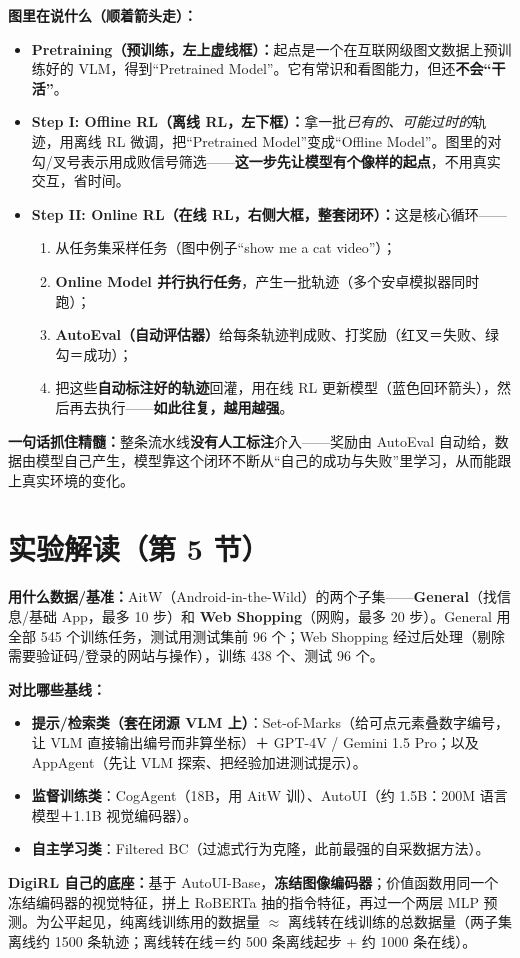\documentclass[11pt,UTF8,fontset=fandol]{ctexart}
\begin{document}
\textbf{图里在说什么（顺着箭头走）：}
\begin{itemize}[leftmargin=1.4em]
\item \textbf{Pretraining（预训练，左上虚线框）：}起点是一个在互联网级图文数据上预训练好的 VLM，得到“Pretrained Model”。它有常识和看图能力，但还\textbf{不会“干活”}。
\item \textbf{Step I: Offline RL（离线 RL，左下框）：}拿一批\emph{已有的、可能过时的}轨迹，用离线 RL 微调，把“Pretrained Model”变成“Offline Model”。图里的对勾/叉号表示用成败信号筛选——\textbf{这一步先让模型有个像样的起点}，不用真实交互，省时间。
\item \textbf{Step II: Online RL（在线 RL，右侧大框，整套闭环）：}这是核心循环——
  \begin{enumerate}[leftmargin=1.6em]
  \item 从任务集采样任务（图中例子“show me a cat video”）；
  \item \textbf{Online Model 并行执行任务}，产生一批轨迹（多个安卓模拟器同时跑）；
  \item \textbf{AutoEval（自动评估器）}给每条轨迹判成败、打奖励（红叉＝失败、绿勾＝成功）；
  \item 把这些\textbf{自动标注好的轨迹}回灌，用在线 RL 更新模型（蓝色回环箭头），然后再去执行——\textbf{如此往复，越用越强}。
  \end{enumerate}
\end{itemize}
\textbf{一句话抓住精髓：}整条流水线\textbf{没有人工标注}介入——奖励由 AutoEval 自动给，数据由模型自己产生，模型靠这个闭环不断从“自己的成功与失败”里学习，从而能跟上真实环境的变化。

\section{实验解读（第 5 节）}

\textbf{用什么数据/基准：}AitW（Android-in-the-Wild）的两个子集——\textbf{General}（找信息/基础 App，最多 10 步）和 \textbf{Web Shopping}（网购，最多 20 步）。General 用全部 545 个训练任务，测试用测试集前 96 个；Web Shopping 经过后处理（剔除需要验证码/登录的网站与操作），训练 438 个、测试 96 个。

\textbf{对比哪些基线：}
\begin{itemize}[leftmargin=1.4em]
\item \textbf{提示/检索类（套在闭源 VLM 上）}：Set-of-Marks（给可点元素叠数字编号，让 VLM 直接输出编号而非算坐标）＋ GPT-4V / Gemini 1.5 Pro；以及 AppAgent（先让 VLM 探索、把经验加进测试提示）。
\item \textbf{监督训练类}：CogAgent（18B，用 AitW 训）、AutoUI（约 1.5B：200M 语言模型＋1.1B 视觉编码器）。
\item \textbf{自主学习类}：Filtered BC（过滤式行为克隆，此前最强的自采数据方法）。
\end{itemize}
\textbf{DigiRL 自己的底座：}基于 AutoUI-Base，\textbf{冻结图像编码器}；价值函数用同一个冻结编码器的视觉特征，拼上 RoBERTa 抽的指令特征，再过一个两层 MLP 预测。为公平起见，纯离线训练用的数据量 $\approx$ 离线转在线训练的总数据量（两子集离线约 1500 条轨迹；离线转在线＝约 500 条离线起步 + 约 1000 条在线）。
\end{document}
